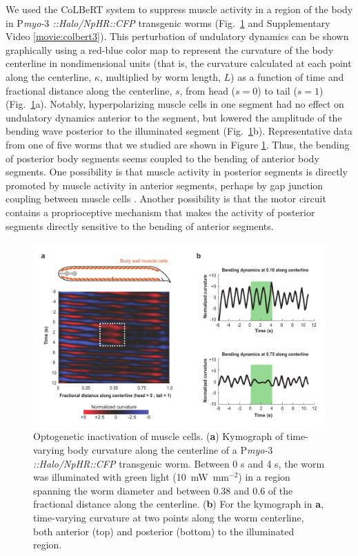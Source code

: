 We used the CoLBeRT system to suppress muscle activity in a region of the body in P\textit{myo-$3$ ::Halo/NpHR::CFP} transgenic worms (Fig.~\ref{fig:colbert2} and Supplementary Video \ref{movie:colbert3}). This perturbation of undulatory dynamics can be shown graphically using a red-blue color map to represent the curvature of the body centerline in nondimensional units (that is, the curvature calculated at each point along the centerline, $\kappa$, multiplied by worm length, $L$) as a function of time and fractional distance along the centerline, $s$, from head ($s = 0$) to tail ($s = 1$) (Fig.~\ref{fig:colbert2}a). Notably, hyperpolarizing muscle cells in one segment had no effect on undulatory dynamics anterior to the segment, but lowered the amplitude of the bending wave posterior to the illuminated segment (Fig.~\ref{fig:colbert2}b). Representative data from one of five worms that we studied are shown in Figure \ref{fig:colbert2}. Thus, the bending of posterior body segments seems coupled to the bending of anterior body segments. One possibility is that muscle activity in posterior segments is directly promoted by muscle activity in anterior segments, perhaps by gap junction coupling between muscle cells \citep{liu_low_2006}. Another possibility is that the motor circuit contains a proprioceptive mechanism that makes the activity of posterior segments directly sensitive to the bending of anterior segments.

\begin{figure} 
\includegraphics[width=\textwidth]{figures/colbert2}
\caption[Optogenetic inactivation of muscle cells.]{Optogenetic inactivation of muscle cells. (\textbf{a}) Kymograph of time-varying body curvature along the centerline of a P\textit{myo-$3$::Halo/NpHR::CFP} transgenic worm. Between 0 s and 4 s, the worm was illuminated with green light (10~mW~mm$^{-2}$) in a region spanning the worm diameter and between 0.38 and 0.6 of the fractional distance along the centerline. (\textbf{b}) For the kymograph in \textbf{a}, time-varying curvature at two points along the worm centerline, both anterior (top) and posterior (bottom) to the illuminated region. \label{fig:colbert2}}
\end{figure}


